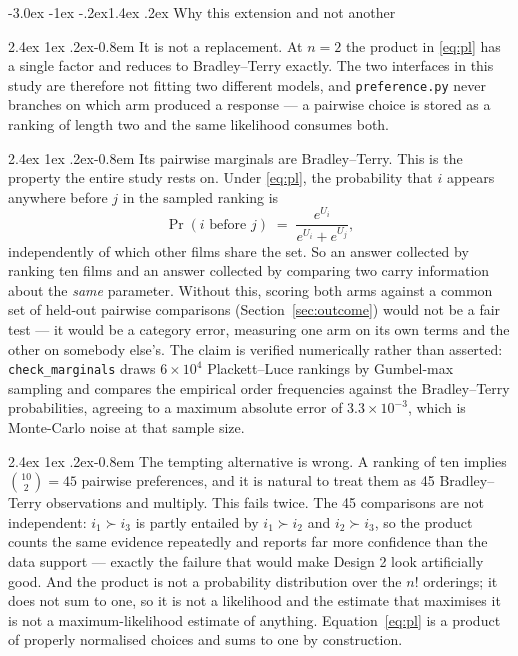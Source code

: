 \documentclass[11pt,a4paper]{article}
\makeatletter
\renewcommand\subsection{\@startsection{subsection}{2}{\z@}%
  {-3.0ex \@plus -1ex \@minus -.2ex}{1.4ex \@plus .2ex}%
  {\normalfont\large\sffamily\bfseries\color{accent}}}
\renewcommand\paragraph{\@startsection{paragraph}{4}{\z@}%
  {2.4ex \@plus1ex \@minus.2ex}{-0.8em}%
  {\normalfont\normalsize\sffamily\bfseries\color{black}}}
\newcommand{\file}[1]{\texttt{\small #1}}
\makeatother
\begin{document}
\subsection{Why this extension and not another}

\paragraph{It is not a replacement.} At $n = 2$ the product in \eqref{eq:pl} has
a single factor and reduces to Bradley--Terry exactly. The two interfaces in this
study are therefore not fitting two different models, and \file{preference.py}
never branches on which arm produced a response --- a pairwise choice is stored
as a ranking of length two and the same likelihood consumes both.

\paragraph{Its pairwise marginals are Bradley--Terry.} This is the property the
entire study rests on. Under \eqref{eq:pl}, the probability that $i$ appears
anywhere before $j$ in the sampled ranking is
\[
  \Pr(i \text{ before } j) \;=\; \frac{e^{U_i}}{e^{U_i}+e^{U_j}},
\]
independently of which other films share the set. So an answer collected by
ranking ten films and an answer collected by comparing two carry information
about the \emph{same} parameter. Without this, scoring both arms against a common
set of held-out pairwise comparisons (Section~\ref{sec:outcome}) would not be a
fair test --- it would be a category error, measuring one arm on its own terms
and the other on somebody else's. The claim is verified numerically rather than
asserted: \file{check\_marginals} draws $6\times10^4$ Plackett--Luce rankings by
Gumbel-max sampling and compares the empirical order frequencies against the
Bradley--Terry probabilities, agreeing to a maximum absolute error of
$3.3\times10^{-3}$, which is Monte-Carlo noise at that sample size.

\paragraph{The tempting alternative is wrong.} A ranking of ten implies
$\binom{10}{2} = 45$ pairwise preferences, and it is natural to treat them as 45
Bradley--Terry observations and multiply. This fails twice. The 45 comparisons
are not independent: $i_1 \succ i_3$ is partly entailed by $i_1 \succ i_2$ and
$i_2 \succ i_3$, so the product counts the same evidence repeatedly and reports
far more confidence than the data support --- exactly the failure that would make
Design 2 look artificially good. And the product is not a probability
distribution over the $n!$ orderings; it does not sum to one, so it is not a
likelihood and the estimate that maximises it is not a maximum-likelihood
estimate of anything. Equation~\eqref{eq:pl} is a product of properly normalised
choices and sums to one by construction.
\end{document}
